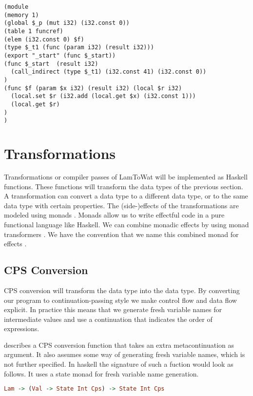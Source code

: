 {\begin{lstlisting}
(module
(memory 1)
(global $_p (mut i32) (i32.const 0))
(table 1 funcref)
(elem (i32.const 0) $f)
(type $_t1 (func (param i32) (result i32)))
(export "_start" (func $_start))
(func $_start  (result i32) 
  (call_indirect (type $_t1) (i32.const 41) (i32.const 0))
)
(func $f (param $x i32) (result i32) (local $r i32)
  (local.set $r (i32.add (local.get $x) (i32.const 1)))
  (local.get $r)
)
)
\end{lstlisting}

\section{\label{section:transforms}Transformations}
Transformations or compiler passes of LamToWat will be implemented as Haskell functions. These functions will transform the data types of the previous section. A transformation can convert a data type to a different data type, or to the same data type with certain properties. The (side-)effects of the transformations are modeled using monads \autocite{DBLP:conf/lics/Moggi89}. Monads allow us to write effectful code in a pure functional language like Haskell. We can combine monadic effects by using monad transformers \autocite{DBLP:conf/popl/LiangHJ95}. We have the convention that we name this combined monad for effects .

\subsection{\label{subsection:cpsconvert}CPS Conversion}
CPS conversion will transform the  data type into the  data type. By converting our program to continuation-passing style we make control flow and data flow explicit. In practice this means that we generate fresh variable names for intermediate values and use a continuation that indicates the order of expressions.

\citeauthor{DBLP:books/daglib/0022396} describes a CPS conversion function that takes an extra metacontinuation as argument. It also assumes some way of generating fresh variable names, which is not further specified. In haskell the signature of such a fuction would look as follows. It uses a state monad for fresh variable name generation.

\begin{lstlisting}[language=Haskell]
Lam -> (Val -> State Int Cps) -> State Int Cps
\end{lstlisting}

}
